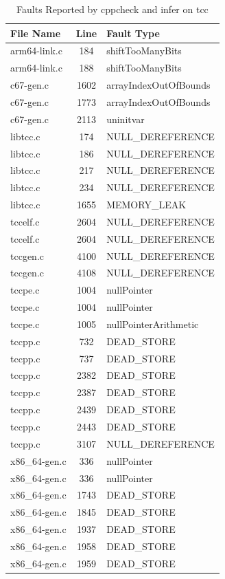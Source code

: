 \documentclass[conference]{IEEEtran}
\begin{document}
\begin{table}[htbp]
    \centering
    \caption{Faults Reported by cppcheck and infer on tcc}
    \label{tab:tcc_faults}
    \begin{tabular}{>{\raggedright\arraybackslash}p{3cm} c p{5cm}}
        \toprule
        \textbf{File Name} & \textbf{Line} & \textbf{Fault Type} \\
        \midrule
        arm64-link.c & 184 & shiftTooManyBits \\
        arm64-link.c & 188 & shiftTooManyBits \\
        c67-gen.c & 1602 & arrayIndexOutOfBounds \\
        c67-gen.c & 1773 & arrayIndexOutOfBounds \\
        c67-gen.c & 2113 & uninitvar \\
        libtcc.c & 174 & NULL\_DEREFERENCE \\
        libtcc.c & 186 & NULL\_DEREFERENCE \\
        libtcc.c & 217 & NULL\_DEREFERENCE \\
        libtcc.c & 234 & NULL\_DEREFERENCE \\
        libtcc.c & 1655 & MEMORY\_LEAK \\
        tccelf.c & 2604 & NULL\_DEREFERENCE \\
        tccelf.c & 2604 & NULL\_DEREFERENCE \\
        tccgen.c & 4100 & NULL\_DEREFERENCE \\
        tccgen.c & 4108 & NULL\_DEREFERENCE \\
        tccpe.c & 1004 & nullPointer \\
        tccpe.c & 1004 & nullPointer \\
        tccpe.c & 1005 & nullPointerArithmetic \\
        tccpp.c & 732 & DEAD\_STORE \\
        tccpp.c & 737 & DEAD\_STORE \\
        tccpp.c & 2382 & DEAD\_STORE \\
        tccpp.c & 2387 & DEAD\_STORE \\
        tccpp.c & 2439 & DEAD\_STORE \\
        tccpp.c & 2443 & DEAD\_STORE \\
        tccpp.c & 3107 & NULL\_DEREFERENCE \\
        x86\_64-gen.c & 336 & nullPointer \\
        x86\_64-gen.c & 336 & nullPointer \\
        x86\_64-gen.c & 1743 & DEAD\_STORE \\
        x86\_64-gen.c & 1845 & DEAD\_STORE \\
        x86\_64-gen.c & 1937 & DEAD\_STORE \\
        x86\_64-gen.c & 1958 & DEAD\_STORE \\
        x86\_64-gen.c & 1959 & DEAD\_STORE \\
        \bottomrule
    \end{tabular}
\end{table}
\end{document}
